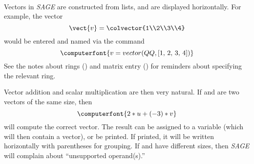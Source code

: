 \contributedby{\robertbeezer}\\
Vectors in {\sl SAGE} are constructed from lists, and are displayed horizontally.  For example, the vector
%
\begin{equation*}
\vect{v}=\colvector{1\\2\\3\\4}
\end{equation*}
%
would be entered and named via the command
%
\begin{equation*}
\computerfont{v=vector(QQ, [1,\,2,\,3,\,4])}
\end{equation*}
%
See the notes about rings () and matrix entry () for reminders about specifying the relevant ring.\par
%
Vector addition and scalar multiplication are then very natural.  If  and  are two vectors of the same size, then
%
\begin{equation*}
\computerfont{2 * u + (-3) * v}
\end{equation*}
%
will compute the correct vector.  The result can be assigned to a variable (which will then contain a vector), or be printed.  If printed, it will be written horizontally with parentheses for grouping.  If  and  have different sizes, then {\sl SAGE} will complain about ``unsupported operand(s).''
